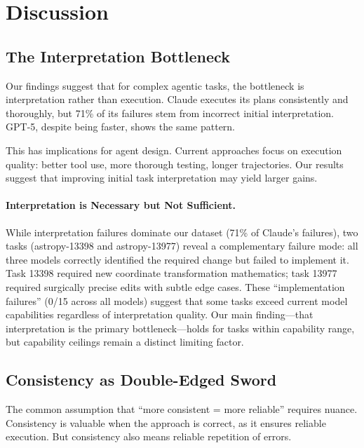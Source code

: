 \documentclass{article}
\begin{document}
\section{Discussion}
\label{sec:discussion}

\subsection{The Interpretation Bottleneck}

Our findings suggest that for complex agentic tasks, the bottleneck is interpretation rather than execution. Claude executes its plans consistently and thoroughly, but 71\% of its failures stem from incorrect initial interpretation. GPT-5, despite being faster, shows the same pattern.

This has implications for agent design. Current approaches focus on execution quality: better tool use, more thorough testing, longer trajectories. Our results suggest that improving initial task interpretation may yield larger gains.

\paragraph{Interpretation is Necessary but Not Sufficient.} 
While interpretation failures dominate our dataset (71\% of Claude's failures), 
two tasks (astropy-13398 and astropy-13977) reveal a complementary failure mode: 
all three models correctly identified the required change but failed to implement it. 
Task 13398 required new coordinate transformation mathematics; task 13977 required 
surgically precise edits with subtle edge cases. These ``implementation failures'' 
(0/15 across all models) suggest that some tasks exceed current model capabilities 
regardless of interpretation quality. Our main finding---that interpretation is the 
primary bottleneck---holds for tasks within capability range, but capability ceilings 
remain a distinct limiting factor.

\subsection{Consistency as Double-Edged Sword}

The common assumption that ``more consistent = more reliable'' requires nuance. Consistency is valuable when the approach is correct, as it ensures reliable execution. But consistency also means reliable repetition of errors.
\end{document}
